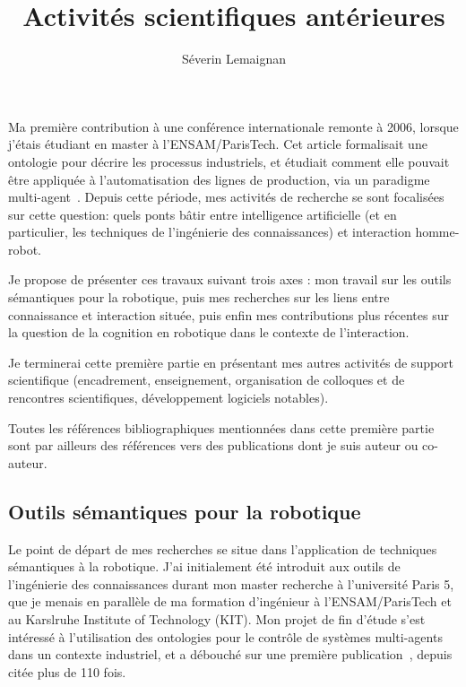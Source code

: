\documentclass[a4paper]{article}
\title{Activités scientifiques antérieures}
\author{Séverin Lemaignan}
\date{}
\begin{document}
\maketitle

Ma première contribution à une conférence internationale remonte à 2006, lorsque
j'étais étudiant en master à l'ENSAM/ParisTech. Cet article formalisait une
ontologie pour décrire les processus industriels, et étudiait comment elle
pouvait être appliquée à l'automatisation des lignes de production, via un
paradigme multi-agent~\cite{lemaignan2006mason}. Depuis cette période, mes
activités de recherche se sont focalisées sur cette question: quels ponts bâtir
entre intelligence artificielle (et en particulier, les techniques de
l'ingénierie des connaissances) et interaction homme-robot.

Je propose de présenter ces travaux suivant trois axes : mon travail sur les
outils sémantiques pour la robotique, puis mes recherches sur les liens entre
connaissance et interaction située, puis enfin mes contributions plus récentes
sur la question de la cognition en robotique dans le contexte de l'interaction.

Je terminerai cette première partie en présentant mes autres activités de
support scientifique (encadrement, enseignement, organisation de colloques et de
rencontres scientifiques, développement logiciels notables).

Toutes les références bibliographiques mentionnées dans cette première partie
sont par ailleurs des références vers des publications dont je suis auteur ou
co-auteur.

\subsection*{Outils sémantiques pour la robotique%
  \label{semantic-tools-for-robotics}%
}

Le point de départ de mes recherches se situe dans l'application de techniques
sémantiques à la robotique. J'ai initialement été introduit aux outils de
l'ingénierie des connaissances durant mon master recherche à l'université Paris
5, que je menais en parallèle de ma formation d'ingénieur à l'ENSAM/ParisTech et
au Karslruhe Institute of Technology (KIT). Mon projet de fin d'étude s'est
intéressé à l'utilisation des ontologies pour le contrôle de systèmes
multi-agents dans un contexte industriel, et a débouché sur une première
publication~\cite{lemaignan2006mason}, depuis citée plus de 110 fois.
\end{document}
